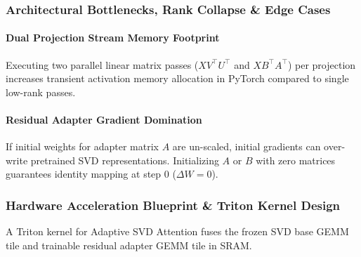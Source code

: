\subsubsection*{Architectural Bottlenecks, Rank Collapse \& Edge Cases}

\paragraph{Dual Projection Stream Memory Footprint}
Executing two parallel linear matrix passes ($X V^\top U^\top$ and $X B^\top A^\top$) per projection increases transient activation memory allocation in PyTorch compared to single low-rank passes.

\paragraph{Residual Adapter Gradient Domination}
If initial weights for adapter matrix $A$ are un-scaled, initial gradients can over-write pretrained SVD representations. Initializing $A$ or $B$ with zero matrices guarantees identity mapping at step 0 ($\Delta W = 0$).


\subsubsection*{Hardware Acceleration Blueprint \& Triton Kernel Design}

A Triton kernel for Adaptive SVD Attention fuses the frozen SVD base GEMM tile and trainable residual adapter GEMM tile in SRAM.

